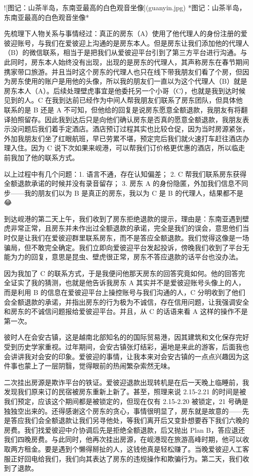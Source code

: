 ![图记：山茶半岛，东南亚最高的白色观音坐像](guanyin.jpg)
*图记：山茶半岛，东南亚最高的白色观音坐像*

先梳理下人物关系与事情经过：真正的房东（A）使用了他代理人的身份注册的爱彼迎账号，与我们在爱彼迎上沟通的是房东本人。但是房东让我们添加他的代理人（B）的微信联系，相当于是把我们从爱彼迎平台引到了第三方平台进行沟通。与此同时，房东本人始终没有出现，出现的是房东的代理人，其声称房东在春节期间携家带口旅游。并且当时这个房东的代理人也只在线下带我朋友们看了个房，但因为房东使用的账户是用他的头像，所以我的朋友们一直以为这个代理人（B）就是房东本人（A）。后续处理壁虎事宜是他委托另一个小哥（C），也就是我到达时候见到的人。C 在我到达前已经作为中间人帮我朋友们联系了房东团队，但具体他联系的是 B 还是 A 不可知，但他给的回复是说房东愿意全额退款，我朋友有将翻译拍照留存。因此我到达后只是向他们确认房东是否真的愿意全额退款，我朋友表示没问题后我们着手定酒店。酒店预订过程其实也比较仓促，因为当时房源紧张，外加我朋友们坐了红眼航班，早已劳累不堪，预定完后我们就火速打车赶往酒店办理入住。因为 C 说下次如果来岘港，可以帮我们订价格更优惠的酒店，所以临走前我加了他的联系方式。

以上过程中有几个问题：1. 语言不通，存在认知偏差； 2. C 帮我们联系房东获得全额退款承诺的时候并没有录音留存； 3. 房东 A 的身份隐匿，外加我们信息不同步——我的朋友们以为 B 是真正的房东，我以为 C 是 B 的代理人，结果都不是😂

到达岘港的第二天上午，我们收到了房东拒绝退款的提示，理由是：东南亚遇到壁虎非常正常，且房东并未作出过全额退款的承诺，完全是我们的误会，意思他们当时仅是让我们在爱彼迎群里联系房东，而不是答应全额退款。我们觉得这像是一场骗局，但不敢完全确定。我们立即向爱彼迎平台发起投诉，傍晚我们收到了平台无能为力的回复，意思是昆虫、壁虎很正常，房东不答应退款的话平台也没办法。

因为我加了 C 的联系方式，于是我便问他那天房东的回答究竟如何。他的回答完全证实了我的猜测，也就是他告诉我房东 A 其实并不是爱彼迎账号头像上的人，而是利用 B 的信息在爱彼迎平台上操控账号与我们沟通的人，C 分明收到了他们会全额退款的承诺，并指出房东的行为极为不诚信，存在信用问题，让我强调安全和房东的不诚信问题报给爱彼迎平台。并且，从 C 的话语来看 A 这样的操作不是第一次。

彼时人在会安古镇，这是越南北部知名的的国际贸易港，因其建筑和文化保存完好受到历史学家重视。过年期间，会安古镇张灯结彩，遍地是来此的游客，后面我也会讲讲我对会安的印象。爱彼迎的事情，让我本来对会安古镇的一点点兴趣因为这件事也蒙上了一层阴翳，觉得眼前的热闹繁杂索然无味。

二次挂出房源是欺诈平台的铁证。爱彼迎退款出现转机是在后一天晚上临睡前，我发现我们原来订的民宿被房东重新上新了。甚至，照理来说 2.15-2.21 的时间是被我们预定，应该这个期间都是被锁定的，但现在仅有 2.15-2.20 被锁定，21 号确是独独空出来的。还得感谢这个房东的贪心，事情很明显了，房东就是故意的——先是答应我们会全额退款让我们另寻他处，等我们离开后又变卦想要吞下我们六晚的房费。我们找爱彼迎中介协调后先是拒绝全额退款，后又抛出 Plan B，答应退还我们四晚房费。与此同时，他再次挂出房源，在岘港现在旅游高峰时期，他可以收取两方租金。要是遇到个懒得掰扯的人，这钱他真是轻松赚了。当晚爱彼迎人工客服正好回电给我们，我们向其表达了房东的违规操作和欺骗行为。第二天，我们收到了退款。

